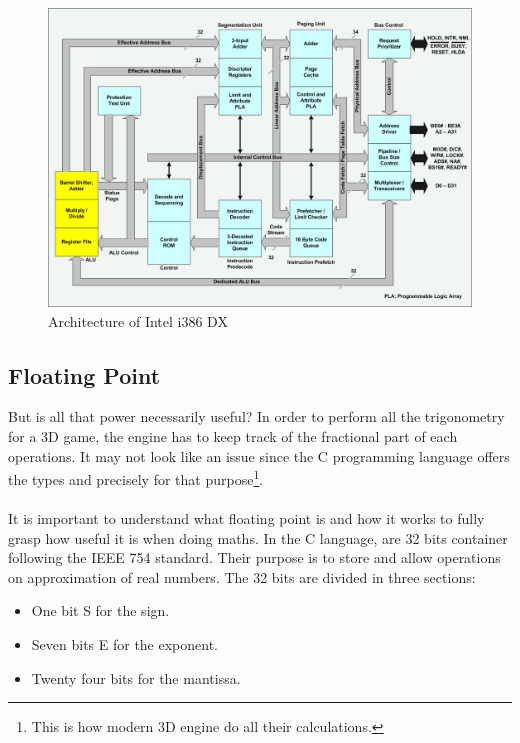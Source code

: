 \documentclass[book.tex]{subfiles}
\begin{document}
\begin{figure}[H]
\centering
  
      \includegraphics[width=\textwidth]{screenshots/hardware/80386DX_arch.png}
\caption{Architecture of Intel i386 DX}
\end{figure}








  \subsection{Floating Point}
  
   But is all that power necessarily useful? In order to perform all the trigonometry for a 3D game, the engine has to keep track of the fractional part of each operations. It may not look like an issue since the C programming language offers the types  and  precisely for that purpose\footnote{This is how modern 3D engine do all their calculations.}.\\
\\
It is important to understand what floating point is and how it works to fully grasp how useful it is when doing maths. In the C language,  are 32 bits container following the IEEE 754 standard. Their purpose is to store and allow operations on approximation of real numbers. The 32 bits are divided in three sections:\\
\begin{itemize}
  \item One bit S for the sign.
  \item Seven bits E for the exponent.
  \item Twenty four bits for the mantissa.
\end{itemize} 
\end{document}
